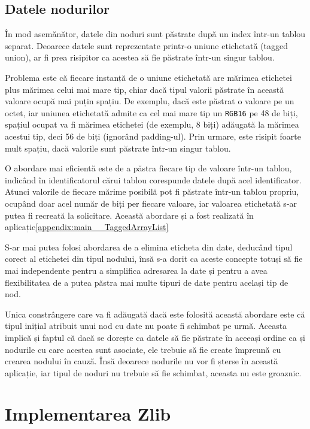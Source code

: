 \documentclass[a4paper,12pt]{report}
\begin{document}
\subsection{Datele nodurilor}

În mod asemănător, datele din noduri sunt păstrate după un index într-un tablou separat.
Deoarece datele sunt reprezentate printr-o uniune etichetată (tagged union),
ar fi prea risipitor ca acestea să fie păstrate într-un singur tablou.

Problema este că fiecare instanță de o uniune etichetată are
mărimea etichetei plus mărimea celui mai mare tip,
chiar dacă tipul valorii păstrate în această valoare ocupă mai puțin spațiu.
De exemplu, dacă este păstrat o valoare pe un octet,
iar uniunea etichetată admite ca cel mai mare tip un \texttt{RGB16} pe 48 de biți,
spațiul ocupat va fi mărimea etichetei (de exemplu, 8 biți) adăugată la mărimea acestui tip,
deci 56 de biți (ignorând padding-ul).
Prin urmare, este risipit foarte mult spațiu, dacă valorile sunt păstrate într-un singur tablou.

O abordare mai eficientă este de a păstra fiecare tip de valoare într-un tablou,
indicând în identificatorul cărui tablou corespunde datele după acel identificator.
Atunci valorile de fiecare mărime posibilă pot fi păstrate într-un tablou propriu,
ocupând doar acel număr de biți per fiecare valoare, 
iar valoarea etichetată s-ar putea fi recreată la solicitare.
Această abordare și a fost realizată în aplicație\ref{appendix:main__TaggedArrayList}

S-ar mai putea folosi abordarea de a elimina eticheta din date,
deducând tipul corect al etichetei din tipul nodului,
însă s-a dorit ca aceste concepte totuși să fie mai independente pentru
a simplifica adresarea la date și pentru a avea flexibilitatea de
a putea păstra mai multe tipuri de date pentru același tip de nod.

Unica constrângere care va fi adăugată dacă este folosită această abordare este că
tipul inițial atribuit unui nod cu date nu poate fi schimbat pe urmă.
Aceasta implică și faptul că dacă se dorește ca datele să fie păstrate în aceeași ordine ca și
nodurile cu care acestea sunt asociate, ele trebuie să fie create împreună cu crearea nodului în cauză.
Însă deoarece nodurile nu vor fi șterse în această aplicație,
iar tipul de noduri nu trebuie să fie schimbat, aceasta nu este groaznic.


\section{Implementarea Zlib}
\end{document}

